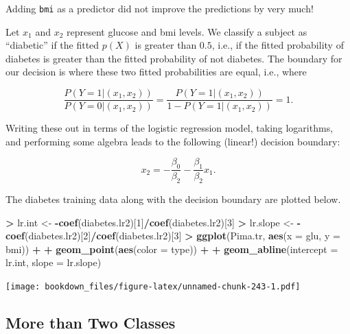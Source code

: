 \documentclass[]{krantz}
\makeatletter
\newenvironment{Shaded}{\begin{snugshade}}{\end{snugshade}}
\newcommand{\KeywordTok}[1]{\textcolor[rgb]{0.27,0.27,0.27}{\textbf{#1}}}
\newcommand{\DataTypeTok}[1]{\textcolor[rgb]{0.27,0.27,0.27}{#1}}
\newcommand{\DecValTok}[1]{\textcolor[rgb]{0.06,0.06,0.06}{#1}}
\newcommand{\StringTok}[1]{\textcolor[rgb]{0.5,0.5,0.5}{#1}}
\newcommand{\OperatorTok}[1]{\textcolor[rgb]{0.43,0.43,0.43}{\textbf{#1}}}
\newcommand{\NormalTok}[1]{#1}
\newenvironment{kframe}{%
\medskip{}
\setlength{\fboxsep}{.8em}
 \def\at@end@of@kframe{}%
 \ifinner\ifhmode%
  \def\at@end@of@kframe{\end{minipage}}%
  \begin{minipage}{\columnwidth}%
 \fi\fi%
 \def\FrameCommand##1{\hskip\@totalleftmargin \hskip-\fboxsep
 \colorbox{shadecolor}{##1}\hskip-\fboxsep
     \hskip-\linewidth \hskip-\@totalleftmargin \hskip\columnwidth}%
 \MakeFramed {\advance\hsize-\width
   \@totalleftmargin\z@ \linewidth\hsize
   \@setminipage}}%
 {\par\unskip\endMakeFramed%
 \at@end@of@kframe}
\renewenvironment{Shaded}{\begin{kframe}}{\end{kframe}}
\makeatother
\begin{document}
Adding \texttt{bmi} as a predictor did not improve the predictions by
very much!

Let \(x_1\) and \(x_2\) represent glucose and bmi levels. We classify a
subject as ``diabetic'' if the fitted \(p(X)\) is greater than \(0.5\),
i.e., if the fitted probability of diabetes is greater than the fitted
probability of not diabetes. The boundary for our decision is where
these two fitted probabilities are equal, i.e., where

\[
\frac{P(Y = 1 | (x_1, x_2))}{P(Y = 0 | (x_1, x_2))} = \frac{P(Y = 1 | (x_1, x_2))}{1 - P(Y = 1 | (x_1, x_2))}  = 1.
\]

Writing these out in terms of the logistic regression model, taking
logarithms, and performing some algebra leads to the following (linear!)
decision boundary:

\[
x_2 = -\frac{\beta_0}{\beta_2} - \frac{\beta_1}{\beta_2} x_1.
\]

The diabetes training data along with the decision boundary are plotted
below.

\begin{Shaded}
\begin{Highlighting}[]
\OperatorTok{>}\StringTok{ }\NormalTok{lr.int <-}\StringTok{ }\OperatorTok{-}\KeywordTok{coef}\NormalTok{(diabetes.lr2)[}\DecValTok{1}\NormalTok{]}\OperatorTok{/}\KeywordTok{coef}\NormalTok{(diabetes.lr2)[}\DecValTok{3}\NormalTok{]}
\OperatorTok{>}\StringTok{ }\NormalTok{lr.slope <-}\StringTok{ }\OperatorTok{-}\KeywordTok{coef}\NormalTok{(diabetes.lr2)[}\DecValTok{2}\NormalTok{]}\OperatorTok{/}\KeywordTok{coef}\NormalTok{(diabetes.lr2)[}\DecValTok{3}\NormalTok{]}
\OperatorTok{>}\StringTok{ }\KeywordTok{ggplot}\NormalTok{(Pima.tr, }\KeywordTok{aes}\NormalTok{(}\DataTypeTok{x =}\NormalTok{ glu, }\DataTypeTok{y =}\NormalTok{ bmi)) }\OperatorTok{+}\StringTok{ }
\OperatorTok{+}\StringTok{   }\KeywordTok{geom_point}\NormalTok{(}\KeywordTok{aes}\NormalTok{(}\DataTypeTok{color =}\NormalTok{ type)) }\OperatorTok{+}\StringTok{ }
\OperatorTok{+}\StringTok{   }\KeywordTok{geom_abline}\NormalTok{(}\DataTypeTok{intercept =}\NormalTok{ lr.int, }\DataTypeTok{slope =}\NormalTok{ lr.slope)}
\end{Highlighting}
\end{Shaded}

\texttt{[image: bookdown\_files/figure-latex/unnamed-chunk-243-1.pdf]}

\subsection{More than Two Classes}\label{more-than-two-classes}
\end{document}
